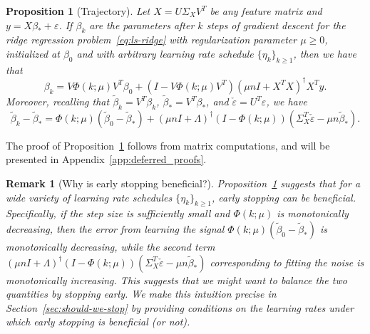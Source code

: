 \documentclass[11pt]{article}
\newtheorem{proposition}[theorem]{Proposition}
\newtheorem{remark}{Remark}
\begin{document}
\begin{proposition}[Trajectory] \label{prop:betak}
Let $X = U\Sigma_X V^T$ be any feature matrix and $y = X \beta_* + \varepsilon$. If $\beta_k$ are the parameters after $k$ steps of gradient descent for the ridge regression problem~\eqref{eq:ls-ridge} with regularization parameter $\mu \geq 0$, initialized at $\beta_0$ and with arbitrary learning rate schedule $\{ \eta_k\}_{k \geq 1}$, then we have that 
\begin{equation} \label{eq:betak_1}
    \beta_k = V\Phi(k; \mu)V^T\beta_0 + (I - V\Phi(k; \mu)V^T)(\mu n I + X^TX)^{\dagger}X^Ty.
\end{equation}
Moreover, recalling that $\tilde{\beta}_k = V^T\beta_k$, $\tilde{\beta}_* = V^T\beta_*$, and $\check{\varepsilon} = U^T \varepsilon$, we have
\begin{equation} \label{eq:betak_2}
    \tilde{\beta}_k - \tilde{\beta}_* = \Phi(k; \mu)(\tilde{\beta}_0 - \tilde{\beta}_*) + (\mu n I + \Lambda)^{\dagger}(I - \Phi(k; \mu))(\Sigma_X^T \check{\varepsilon} - \mu n \tilde{\beta}_*).
\end{equation}
\end{proposition}

The proof of Proposition~\ref{prop:betak} follows from matrix computations, and will be presented in Appendix~\ref{app:deferred_proofs}.

\begin{remark}[Why is early stopping beneficial?]
Proposition~\ref{prop:betak} suggests that for a wide variety of learning rate schedules $\{\eta_k\}_{k \geq 1}$, early stopping can be beneficial. Specifically, if the step size is sufficiently small and $\Phi(k;\mu)$ is monotonically decreasing, then the error from learning the signal $\Phi(k;\mu)(\tilde{\beta}_0 - \tilde{\beta}_*)$ is monotonically decreasing, while the second term $(\mu n I + \Lambda)^{\dagger}(I - \Phi(k; \mu))(\Sigma_X^T \check{\varepsilon} - \mu n \tilde{\beta}_*)$ corresponding to fitting the noise is monotonically increasing. This suggests that we might want to balance the two quantities by stopping early.
We make this intuition precise in Section~\ref{sec:should-we-stop} by providing conditions on the learning rates under which early stopping is beneficial (or not).
\end{remark}
\end{document}
